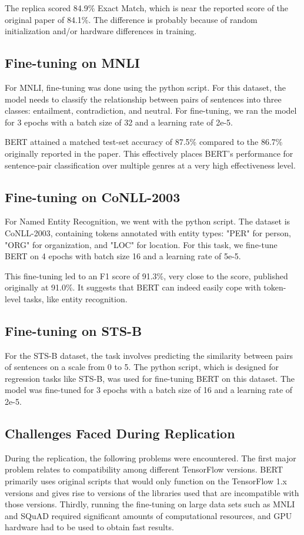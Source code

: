 \documentclass{article}
\begin{document}
The replica scored 84.9\% Exact Match, which is near the reported score of the original paper of 84.1\%. The difference is probably because of random initialization and/or hardware differences in training.

\subsection{Fine-tuning on MNLI}
For MNLI, fine-tuning was done using the python script. For this dataset, the model needs to classify the relationship between pairs of sentences into three classes: entailment, contradiction, and neutral. For fine-tuning, we ran the model for 3 epochs with a batch size of 32 and a learning rate of 2e-5.

BERT attained a matched test-set accuracy of 87.5\% compared to the 86.7\% originally reported in the paper. This effectively places BERT's performance for sentence-pair classification over multiple genres at a very high effectiveness level.

\subsection{Fine-tuning on CoNLL-2003}
For Named Entity Recognition, we went with the python script. The dataset is CoNLL-2003, containing tokens annotated with entity types: "PER" for person, "ORG" for organization, and "LOC" for location. For this task, we fine-tune BERT on 4 epochs with batch size 16 and a learning rate of 5e-5.

This fine-tuning led to an F1 score of 91.3\%, very close to the score, published originally at 91.0\%. It suggests that BERT can indeed easily cope with token-level tasks, like entity recognition.

\subsection{Fine-tuning on STS-B}
For the STS-B dataset, the task involves predicting the similarity between pairs of sentences on a scale from 0 to 5. The python script, which is designed for regression tasks like STS-B, was used for fine-tuning BERT on this dataset. The model was fine-tuned for 3 epochs with a batch size of 16 and a learning rate of 2e-5.


\subsection{Challenges Faced During Replication}
During the replication, the following problems were encountered. The first major problem relates to compatibility among different TensorFlow versions. BERT primarily uses original scripts that would only function on the TensorFlow 1.x versions and gives rise to versions of the libraries used that are incompatible with those versions. Thirdly, running the fine-tuning on large data sets such as MNLI and SQuAD required significant amounts of computational resources, and GPU hardware had to be used to obtain fast results.
\end{document}
